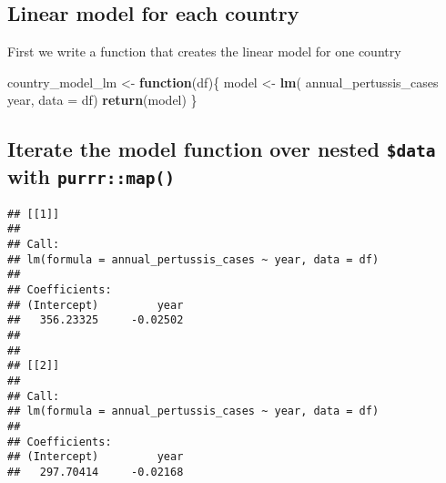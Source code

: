 \documentclass[]{article}
\newenvironment{Shaded}{\begin{snugshade}}{\end{snugshade}}
\newcommand{\KeywordTok}[1]{\textcolor[rgb]{0.13,0.29,0.53}{\textbf{#1}}}
\newcommand{\DataTypeTok}[1]{\textcolor[rgb]{0.13,0.29,0.53}{#1}}
\newcommand{\DecValTok}[1]{\textcolor[rgb]{0.00,0.00,0.81}{#1}}
\newcommand{\StringTok}[1]{\textcolor[rgb]{0.31,0.60,0.02}{#1}}
\newcommand{\ControlFlowTok}[1]{\textcolor[rgb]{0.13,0.29,0.53}{\textbf{#1}}}
\newcommand{\OperatorTok}[1]{\textcolor[rgb]{0.81,0.36,0.00}{\textbf{#1}}}
\newcommand{\NormalTok}[1]{#1}
\begin{document}
\begin{Shaded}
\end{Shaded}

\subsection{Linear model for each
country}\label{linear-model-for-each-country}

First we write a function that creates the linear model for one country

\begin{Shaded}
\begin{Highlighting}[]
\NormalTok{country_model_lm <-}\StringTok{ }\ControlFlowTok{function}\NormalTok{(df)\{}
\NormalTok{  model <-}\StringTok{ }\KeywordTok{lm}\NormalTok{(}
\NormalTok{    annual_pertussis_cases }\OperatorTok{~}\StringTok{ }\NormalTok{year, }
    \DataTypeTok{data =}\NormalTok{ df)}
  \KeywordTok{return}\NormalTok{(model)}
\NormalTok{\}}
\end{Highlighting}
\end{Shaded}

\subsection{\texorpdfstring{Iterate the model function over nested
\texttt{\$data} with
\texttt{purrr::map()}}{Iterate the model function over nested \$data with purrr::map()}}\label{iterate-the-model-function-over-nested-data-with-purrrmap}

\begin{Shaded}
\end{Shaded}

\begin{verbatim}
## [[1]]
## 
## Call:
## lm(formula = annual_pertussis_cases ~ year, data = df)
## 
## Coefficients:
## (Intercept)         year  
##   356.23325     -0.02502  
## 
## 
## [[2]]
## 
## Call:
## lm(formula = annual_pertussis_cases ~ year, data = df)
## 
## Coefficients:
## (Intercept)         year  
##   297.70414     -0.02168
\end{verbatim}
\end{document}
